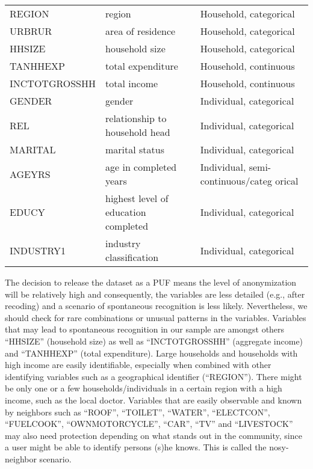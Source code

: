 \documentclass[letterpaper,10pt,english]{sphinxmanual}
\begin{document}
\begin{savenotes}\sphinxattablestart
\centering
\begin{tabulary}{\linewidth}[t]{|T|T|T|}
\hline
\sphinxstyletheadfamily 
{}
&\sphinxstyletheadfamily 
{}
&\sphinxstyletheadfamily 
{}
\\
\hline
REGION
&
region
&
Household,
categorical
\\
\hline
URBRUR
&
area of residence
&
Household,
categorical
\\
\hline
HHSIZE
&
household size
&
Household,
categorical
\\
\hline
TANHHEXP
&
total expenditure
&
Household, continuous
\\
\hline
INCTOTGROSSHH
&
total income
&
Household, continuous
\\
\hline
GENDER
&
gender
&
Individual,
categorical
\\
\hline
REL
&
relationship to
household head
&
Individual,
categorical
\\
\hline
MARITAL
&
marital status
&
Individual,
categorical
\\
\hline
AGEYRS
&
age in completed
years
&
Individual,
semi-continuous/categ
orical
\\
\hline
EDUCY
&
highest level of
education completed
&
Individual,
categorical
\\
\hline
INDUSTRY1
&
industry
classification
&
Individual,
categorical
\\
\hline
\end{tabulary}
\par
\sphinxattableend\end{savenotes}

The decision to release the dataset as a PUF means the level of
anonymization will be relatively high and consequently, the variables
are less detailed (e.g., after recoding) and a scenario of spontaneous
recognition is less likely. Nevertheless, we should check for rare
combinations or unusual patterns in the variables. Variables that may
lead to spontaneous recognition in our sample are amongst others
“HHSIZE” (household size) as well as “INCTOTGROSSHH” (aggregate income)
and “TANHHEXP” (total expenditure). Large households and households with
high income are easily identifiable, especially when combined with other
identifying variables such as a geographical identifier (“REGION”).
There might be only one or a few households/individuals in a certain
region with a high income, such as the local doctor. Variables that are
easily observable and known by neighbors such as “ROOF”, “TOILET”,
“WATER”, “ELECTCON”, “FUELCOOK”, “OWNMOTORCYCLE”, “CAR”, “TV” and
“LIVESTOCK” may also need protection depending on what stands out in the
community, since a user might be able to identify persons (s)he knows.
This is called the nosy-neighbor scenario.
\end{document}
